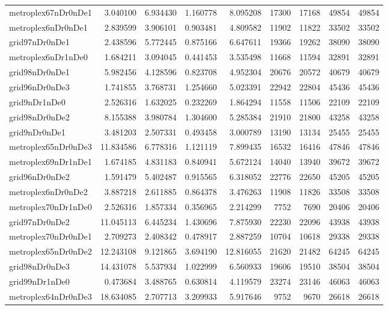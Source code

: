 \begin{longtable}{|l|r|r|r|r|r|r|r|r|}
metroplex67nDr0nDe1 & 3.040100 & 6.934430 & 1.160778 & 8.095208 & 17300 & 17168 & 49854 & 49854 \\
metroplex6nDr0nDe1 & 2.839599 & 3.906101 & 0.903481 & 4.809582 & 11902 & 11822 & 33502 & 33502 \\
grid97nDr0nDe1 & 2.438596 & 5.772445 & 0.875166 & 6.647611 & 19366 & 19262 & 38090 & 38090 \\
metroplex6nDr1nDe0 & 1.684211 & 3.094045 & 0.441453 & 3.535498 & 11668 & 11594 & 32891 & 32891 \\
grid98nDr0nDe1 & 5.982456 & 4.128596 & 0.823708 & 4.952304 & 20676 & 20572 & 40679 & 40679 \\
grid96nDr0nDe3 & 1.741855 & 3.768731 & 1.254660 & 5.023391 & 22942 & 22804 & 45436 & 45436 \\
grid9nDr1nDe0 & 2.526316 & 1.632025 & 0.232269 & 1.864294 & 11558 & 11506 & 22109 & 22109 \\
grid98nDr0nDe2 & 8.155388 & 3.980784 & 1.304600 & 5.285384 & 21910 & 21800 & 43258 & 43258 \\
grid9nDr0nDe1 & 3.481203 & 2.507331 & 0.493458 & 3.000789 & 13190 & 13134 & 25455 & 25455 \\
metroplex65nDr0nDe3 & 11.834586 & 6.778316 & 1.121119 & 7.899435 & 16532 & 16416 & 47846 & 47846 \\
metroplex69nDr1nDe1 & 1.674185 & 4.831183 & 0.840941 & 5.672124 & 14040 & 13940 & 39672 & 39672 \\
grid96nDr0nDe2 & 1.591479 & 5.402487 & 0.915565 & 6.318052 & 22776 & 22650 & 45205 & 45205 \\
metroplex6nDr0nDe2 & 3.887218 & 2.611885 & 0.864378 & 3.476263 & 11908 & 11826 & 33508 & 33508 \\
metroplex70nDr1nDe0 & 2.526316 & 1.857334 & 0.356965 & 2.214299 & 7752 & 7690 & 20406 & 20406 \\
grid97nDr0nDe2 & 11.045113 & 6.445234 & 1.430696 & 7.875930 & 22230 & 22096 & 43938 & 43938 \\
metroplex70nDr0nDe1 & 2.709273 & 2.408342 & 0.478917 & 2.887259 & 10704 & 10618 & 29338 & 29338 \\
metroplex65nDr0nDe2 & 12.243108 & 9.121865 & 3.694190 & 12.816055 & 21620 & 21482 & 64245 & 64245 \\
grid98nDr0nDe3 & 14.431078 & 5.537934 & 1.022999 & 6.560933 & 19606 & 19510 & 38504 & 38504 \\
grid99nDr1nDe0 & 0.473684 & 3.488765 & 0.630814 & 4.119579 & 23274 & 23146 & 46063 & 46063 \\
metroplex64nDr0nDe3 & 18.634085 & 2.707713 & 3.209933 & 5.917646 & 9752 & 9670 & 26618 & 26618 \\

\end{longtable}
